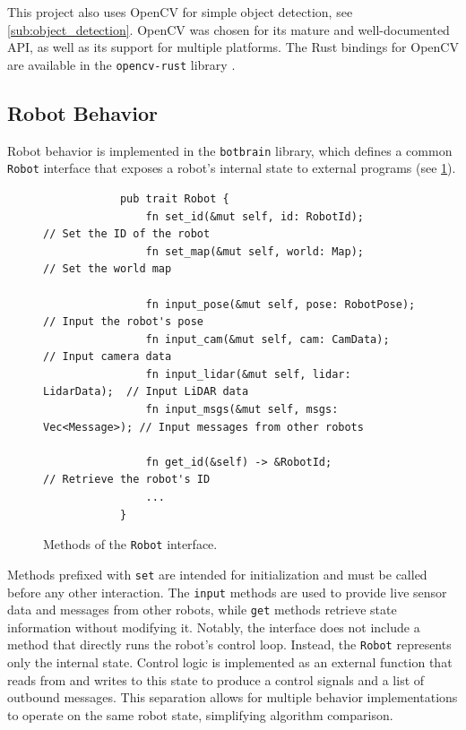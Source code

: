 This project also uses OpenCV for simple object detection, see \cref{sub:object_detection}. OpenCV was chosen for its mature and well-documented API, as well as its support for multiple platforms. The Rust bindings for OpenCV are available in the \texttt{opencv-rust} library \cite{opencv-rust}.


\subsection{Robot Behavior}
Robot behavior is implemented in the \texttt{botbrain} library, which defines a common \texttt{Robot} interface that exposes a robot’s internal state to external programs (see \cref{fig:robot-interface}).

\begin{figure}[H]
    \begin{center}
        \begin{verbatim}
            pub trait Robot {
                fn set_id(&mut self, id: RobotId);            // Set the ID of the robot
                fn set_map(&mut self, world: Map);            // Set the world map

                fn input_pose(&mut self, pose: RobotPose);    // Input the robot's pose
                fn input_cam(&mut self, cam: CamData);        // Input camera data
                fn input_lidar(&mut self, lidar: LidarData);  // Input LiDAR data
                fn input_msgs(&mut self, msgs: Vec<Message>); // Input messages from other robots

                fn get_id(&self) -> &RobotId;                 // Retrieve the robot's ID
                ...
            }
        \end{verbatim}
    \end{center}
    \caption{Methods of the \texttt{Robot} interface.}
    \label{fig:robot-interface}
\end{figure}

Methods prefixed with \texttt{set} are intended for initialization and must be called before any other interaction. The \texttt{input} methods are used to provide live sensor data and messages from other robots, while \texttt{get} methods retrieve state information without modifying it. Notably, the interface does not include a method that directly runs the robot’s control loop. Instead, the \texttt{Robot} represents only the internal state. Control logic is implemented as an external function that reads from and writes to this state to produce a control signals and a list of outbound messages. This separation allows for multiple behavior implementations to operate on the same robot state, simplifying algorithm comparison.


